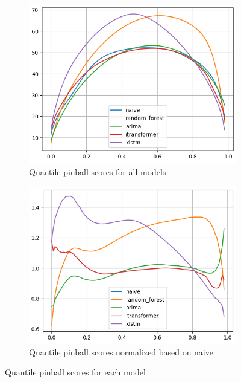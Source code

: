 \documentclass[class=scrbook, crop=false]{standalone}
\begin{document}
\begin{figure}
  \centering
\begin{subfigure}{0.45\textwidth}
  \includegraphics[width=\linewidth]{../images/results/quantile_pinball_scores.png}
  \caption{Quantile pinball scores for all models}
\end{subfigure}
\begin{subfigure}{0.45\textwidth}
  \includegraphics[width=\linewidth]{../images/results/quantile_pinball_scores_to_id1.png}
  \caption{Quantile pinball scores normalized based on naive}
\end{subfigure}
\caption{Quantile pinball scores for each model}
\label{Figure::pinball_scores}
\end{figure}
\end{document}

